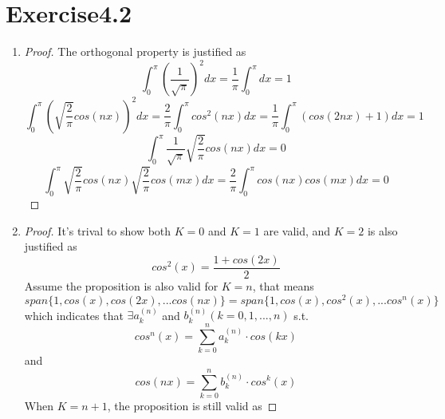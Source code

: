 \documentclass[paper=a4, fontsize=11pt]{scrartcl} %
\numberwithin{equation}{section} %
\numberwithin{figure}{section} %
\numberwithin{table}{section} %
\begin{document}
\section{Exercise4.2}
	\begin{enumerate}
		\item 
			\begin{proof}
				The orthogonal property is justified as
				\begin{equation}
					\int_{0}^{\pi} (\frac{1}{\sqrt{\pi}})^2 dx = \frac{1}{\pi} \int_{0}^{\pi} dx = 1
				\end{equation}
				\begin{equation}
					\int_{0}^{\pi} (\sqrt{\frac{2}{\pi}}cos(nx))^2 dx = \frac{2}{\pi} \int_{0}^{\pi} cos^2(nx)dx = \frac{1}{\pi} \int_{0}^{\pi} (cos(2nx) + 1) dx = 1
				\end{equation}
				\begin{equation}
					\int_{0}^{\pi} \frac{1}{\sqrt{\pi}} \sqrt{\frac{2}{\pi}}cos(nx) dx = 0
				\end{equation}
				\begin{equation}
					\int_{0}^{\pi} \sqrt{\frac{2}{\pi}}cos(nx) \sqrt{\frac{2}{\pi}}cos(mx) dx = \frac{2}{\pi} \int_{0}^{\pi} cos(nx) cos(mx) dx = 0
				\end{equation}
			\end{proof}
		\item 
			\begin{proof}
				It's trival to show both $K=0$ and $K=1$ are valid, and $K=2$ is also justified as
				\begin{equation}
					cos^2(x) = \frac{1+cos(2x)}{2}
				\end{equation}
				Assume the proposition is also valid for $K=n$, that means
				\begin{equation}
					span\{1, cos(x), cos(2x), ... cos(nx)\} = span\{1, cos(x), cos^2(x), ... cos^n(x)\}
				\end{equation}
				which indicates that $\exists a^{(n)}_k$ and $b^{(n)}_k (k=0, 1, ..., n)$ s.t. 
				\begin{equation}
					cos^n(x) = \sum_{k=0}^{n} a^{(n)}_k \cdot cos(kx)
				\end{equation}
				and
				\begin{equation}
					cos(nx) = \sum_{k=0}^{n} b^{(n)}_k \cdot cos^k(x)
				\end{equation}
				When $K = n+1$, the proposition is still valid as
				

\end{proof}
\end{enumerate}
\end{document}
